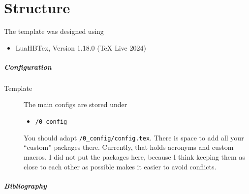 

\chapter{Structure}

The template was designed using 

\begin{itemize}
	\item LuaHBTex, Version 1.18.0 (TeX Live 2024)
\end{itemize}

\paragraph{Configuration}

\begin{description}
	\item[Template] The main configs are stored under 
	\begin{itemize}
	 	\item \lstinline{/0_config}
	 \end{itemize} 
	 You should adapt \lstinline{/0_config/config.tex}. There is space to add all your ``custom'' packages there.
	 Currently, that holds acronyms and custom macros. I did not put the packages here, because I think keeping them as close to each other as possible makes it easier to avoid conflicts.
\end{description}





\paragraph{Bibliography}

